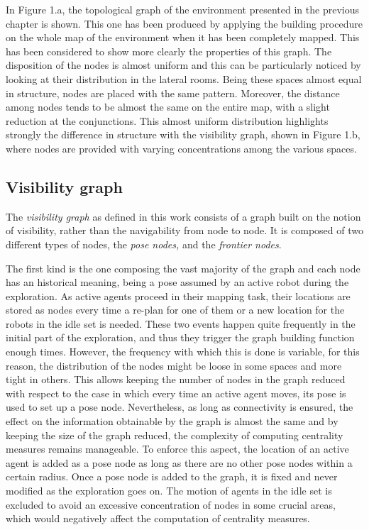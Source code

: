 In Figure 1.a, the topological graph of the environment presented
in the previous chapter is shown. This one has been produced by applying
the building procedure on the whole map of the environment when it
has been completely mapped. This has been considered to show more
clearly the properties of this graph. The disposition of the nodes
is almost uniform and this can be particularly noticed by looking
at their distribution in the lateral rooms. Being these spaces almost
equal in structure, nodes are placed with the same pattern. Moreover,
the distance among nodes tends to be almost the same on the entire
map, with a slight reduction at the conjunctions. This almost uniform
distribution highlights strongly the difference in structure with
the visibility graph, shown in Figure 1.b, where nodes are provided
with varying concentrations among the various spaces. 

\subsection{Visibility graph }

The \emph{visibility graph }as defined in this work consists of a
graph built on the notion of visibility, rather than the navigability
from node to node. It is composed of two different types of nodes,
the \emph{pose nodes,} and the \emph{frontier nodes}. 

The first kind is the one composing the vast majority of the graph
and each node has an historical meaning, being a pose assumed by an
active robot during the exploration. As active agents proceed in their
mapping task, their locations are stored as nodes every time a re-plan
for one of them or a new location for the robots in the idle set is
needed. These two events happen quite frequently in the initial part
of the exploration, and thus they trigger the graph building function
enough times. However, the frequency with which this is done is variable,
for this reason, the distribution of the nodes might be loose in some
spaces and more tight in others. This allows keeping the number of
nodes in the graph reduced with respect to the case in which every
time an active agent moves, its pose is used to set up a pose node.
Nevertheless, as long as connectivity is ensured, the effect on the
information obtainable by the graph is almost the same and by keeping
the size of the graph reduced, the complexity of computing centrality
measures remains manageable. To enforce this aspect, the location
of an active agent is added as a pose node as long as there are no
other pose nodes within a certain radius. Once a pose node is added
to the graph, it is fixed and never modified as the exploration goes
on. The motion of agents in the idle set is excluded to avoid an excessive
concentration of nodes in some crucial areas, which would negatively
affect the computation of centrality measures. 

